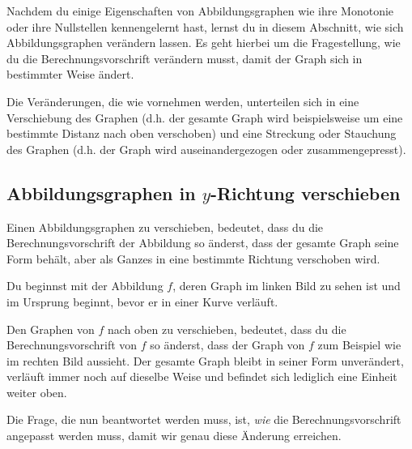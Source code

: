\documentclass[../../main.tex]{subfiles}
\begin{document}
Nachdem du einige Eigenschaften von Abbildungsgraphen wie ihre Monotonie oder ihre Nullstellen kennengelernt hast, lernst du in diesem Abschnitt, wie sich Abbildungsgraphen verändern lassen. Es geht hierbei um die Fragestellung, wie du die Berechnungsvorschrift verändern musst, damit der Graph sich in bestimmter Weise ändert.

Die Veränderungen, die wie vornehmen werden, unterteilen sich in eine Verschiebung des Graphen (d.h. der gesamte Graph wird beispielsweise um eine bestimmte Distanz nach oben verschoben) und eine Streckung oder Stauchung des Graphen (d.h. der Graph wird auseinandergezogen oder zusammengepresst).

\subsection{Abbildungsgraphen in $y$-Richtung verschieben}
\label{sec:abbildungen_verschieben_y}

Einen Abbildungsgraphen zu verschieben, bedeutet, dass du die Berechnungsvorschrift der Abbildung so änderst, dass der gesamte Graph seine Form behält, aber als Ganzes in eine bestimmte Richtung verschoben wird.

\begin{example}{}
    Du beginnst mit der Abbildung $f$, deren Graph im linken Bild zu sehen ist und im Ursprung beginnt, bevor er in einer Kurve verläuft.
    
    Den Graphen von $f$ nach oben zu verschieben, bedeutet, dass du die Berechnungsvorschrift von $f$ so änderst, dass der Graph von $f$ zum Beispiel wie im rechten Bild aussieht. Der gesamte Graph bleibt in seiner Form unverändert, verläuft immer noch auf dieselbe Weise und befindet sich lediglich eine Einheit weiter oben.
    \begin{multicols}{2}\centering
        
    \end{multicols}
    
    Die Frage, die nun beantwortet werden muss, ist, \emph{wie} die Berechnungsvorschrift angepasst werden muss, damit wir genau diese Änderung erreichen.
\end{example}
\end{document}
